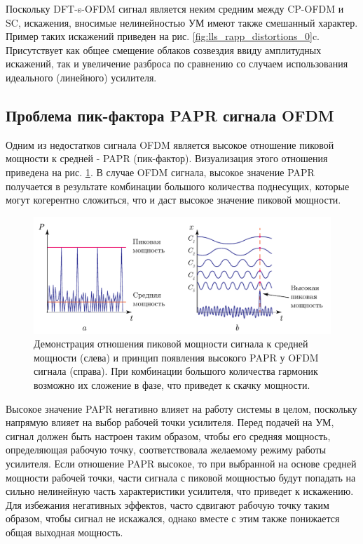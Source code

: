 Поскольку DFT-s-OFDM сигнал является неким средним между CP-OFDM и SC,
искажения, вносимые нелинейностью УМ имеют также смешанный характер. Пример
таких искажений приведен на рис. \ref{fig:lls_rapp_distortions_0}c.
Присутствует как общее смещение облаков созвездия ввиду амплитудных
искажений, так и увеличение разброса по сравнению со случаем
использования идеального (линейного) усилителя.

\subsection{Проблема пик-фактора PAPR сигнала OFDM}
\label{sec:papr}
Одним из недостатков сигнала OFDM является высокое отношение пиковой
мощности к средней - PAPR (пик-фактор). Визуализация этого отношения приведена на рис.
\ref{fig:papr}. В случае OFDM сигнала, высокое значение PAPR получается в
результате комбинации большого количества поднесущих, которые могут
когерентно сложиться, что и даст высокое значение пиковой мощности.
 
\begin{figure}[h!]
    \centering
    \includegraphics[scale=1]{figs/papr_explanation.pdf}
    \caption{Демонстрация отношения пиковой мощности сигнала к средней
    мощности (слева) и принцип появления высокого PAPR у OFDM
    сигнала (справа). При комбинации большого количества гармоник возможно
    их сложение в фазе, что приведет к скачку мощности.}
    \label{fig:papr}
\end{figure}
Высокое значение PAPR негативно влияет на работу системы в целом, поскольку
напрямую влияет на выбор рабочей точки усилителя. Перед подачей на УМ,
сигнал должен быть настроен таким образом, чтобы его средняя мощность,
определяющая рабочую точку, соответствовала желаемому режиму работы
усилителя. Если отношение PAPR высокое, то при выбранной на основе средней
мощности рабочей точки, части сигнала с пиковой мощностью будут попадать на
сильно нелинейную часть характеристики усилителя, что приведет к
искажению. Для избежания негативных эффектов, часто сдвигают рабочую точку
таким образом, чтобы сигнал не искажался, однако вместе с этим также
понижается общая выходная мощность.

